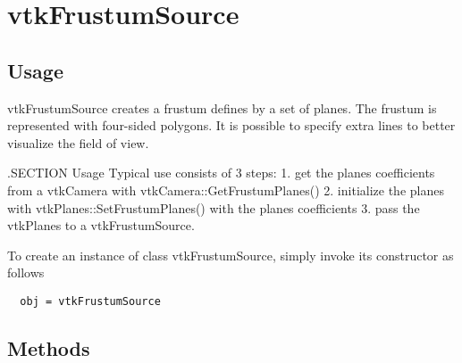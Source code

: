 \section{vtkFrustumSource}

\subsection{Usage}

 vtkFrustumSource creates a frustum defines by a set of planes. The frustum
 is represented with four-sided polygons. It is possible to specify extra
 lines to better visualize the field of view.

 .SECTION Usage
 Typical use consists of 3 steps:
 1. get the planes coefficients from a vtkCamera with
 vtkCamera::GetFrustumPlanes()
 2. initialize the planes with vtkPlanes::SetFrustumPlanes() with the planes
 coefficients
 3. pass the vtkPlanes to a vtkFrustumSource.

To create an instance of class vtkFrustumSource, simply
invoke its constructor as follows
\begin{verbatim}
  obj = vtkFrustumSource
\end{verbatim}
\subsection{Methods}

